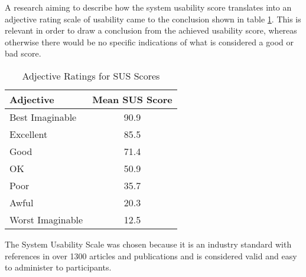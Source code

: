 A research aiming to describe how the system usability score translates into an adjective rating scale of usability came to the conclusion shown in table \ref{fig:susadj}. \citep[page 118]{Aaron} This is relevant in order to draw a conclusion from the achieved usability score, whereas otherwise there would be no specific indications of what is considered a good or bad score.

\begin{table}[ht]
  \centering
  \begin{tabular}{lc}
    \toprule
    Adjective & Mean SUS Score\\
    \midrule
    Best Imaginable & 90.9\\
    Excellent & 85.5\\
    Good & 71.4\\
    OK & 50.9\\
    Poor & 35.7\\
    Awful & 20.3\\
    Worst Imaginable & 12.5\\
    \bottomrule
  \end{tabular}
  \caption{Adjective Ratings for SUS Scores}\label{fig:susadj}
\end{table}

The System Usability Scale was chosen because it is an industry standard with references in over 1300 articles and publications and is considered valid and easy to administer to participants. \citep{Gov}
